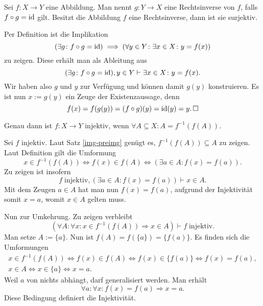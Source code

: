 \begin{Satz}
Sei $f\colon X\to Y$ eine Abbildung. Man nennt $g\colon Y\to X$ eine
Rechtsinverse von $f$, falls $f\circ g = \operatorname{id}$ gilt.
Besitzt die Abbildung $f$ eine Rechtsinverse, dann ist sie surjektiv.
\end{Satz}
\begin{Beweis}
Per Definition ist die Implikation
\[(\exists g\colon f\circ g = \operatorname{id})\implies (\forall y\in Y\colon\exists x\in X\colon y=f(x))\]
zu zeigen. Diese erhält man als Ableitung aus
\[(\exists g\colon f\circ g = \operatorname{id}), y\in Y\vdash\exists x\in X\colon y=f(x).\]
Wir haben also $g$ und $y$ zur Verfügung und können damit $g(y)$ konstruieren.
Es ist nun $x:=g(y)$ ein Zeuge der Existenzaussage, denn
\[f(x) = f(g(y)) = (f\circ g)(y) = \operatorname{id}(y) = y.\,\square\]
\end{Beweis}

\newpage
\begin{Satz}
Genau dann ist $f\colon X\to Y$ injektiv, wenn
$\forall A\subseteq X\colon A=f^{-1}(f(A))$.
\end{Satz}
\begin{Beweis}
Sei $f$ injektiv. Laut Satz \ref{img-preimg} genügt es,
$f^{-1}(f(A))\subseteq A$ zu zeigen. Laut Definition gilt die Umformung
\[x\in f^{-1}(f(A))\iff f(x)\in f(A)\iff(\exists a\in A\colon f(x)=f(a)).\]
Zu zeigen ist insofern
\[f\;\text{injektiv}, (\exists a\in A\colon f(x)=f(a))\vdash x\in A.\]
Mit dem Zeugen $a\in A$ hat man nun $f(x)=f(a)$, aufgrund der Injektivität
somit $x=a$, womit $x\in A$ gelten muss.

Nun zur Umkehrung. Zu zeigen verbleibt
\[(\forall A\colon \forall x\colon x\in f^{-1}(f(A))\Rightarrow x\in A)
\vdash f\;\text{injektiv}.\]
Man setze $A:=\{a\}$. Nun ist $f(A)=f(\{a\}) = \{f(a)\}$. Es finden sich
die Umformungen
\begin{gather*}
x\in f^{-1}(f(A))\iff f(x)\in f(A)\iff f(x)\in\{f(a)\}\iff f(x)=f(a),\\
x\in A\iff x\in\{a\}\iff x=a.
\end{gather*}
Weil $a$ von nichts abhängt, darf generalisiert werden. Man erhält
\[\forall a\colon\forall x\colon f(x)=f(a)\Rightarrow x=a.\]
Diese Bedingung definiert die Injektivität.\,\qedsymbol
\end{Beweis}

